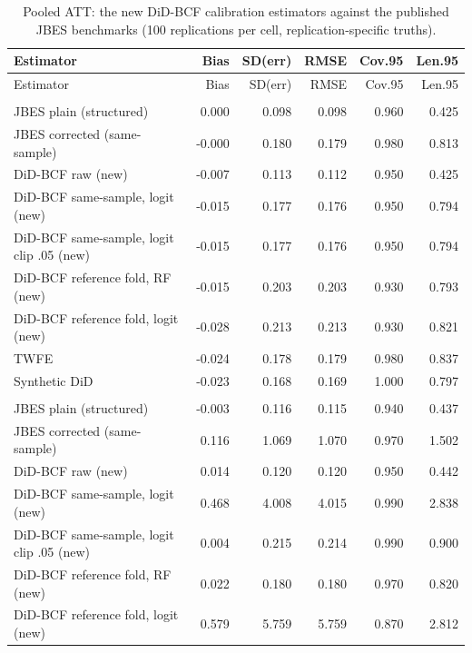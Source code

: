 {\footnotesize
\begin{longtable}{lrrrrr}
\caption{Pooled ATT: the new DiD-BCF calibration estimators against the published JBES benchmarks (100 replications per cell, replication-specific truths).}\label{tab:benchatt}\\
\toprule
Estimator & Bias & SD(err) & RMSE & Cov.95 & Len.95 \\
\midrule
\endfirsthead
\toprule
Estimator & Bias & SD(err) & RMSE & Cov.95 & Len.95 \\
\midrule
\endhead
\bottomrule
\endlastfoot
\multicolumn{6}{l}{\textit{baseline, $N=200$, degree $d=1$}} \\
\quad JBES plain (structured) & 0.000 & 0.098 & 0.098 & 0.960 & 0.425 \\
\quad JBES corrected (same-sample) & -0.000 & 0.180 & 0.179 & 0.980 & 0.813 \\
\quad DiD-BCF raw (new) & -0.007 & 0.113 & 0.112 & 0.950 & 0.425 \\
\quad DiD-BCF same-sample, logit (new) & -0.015 & 0.177 & 0.176 & 0.950 & 0.794 \\
\quad DiD-BCF same-sample, logit clip .05 (new) & -0.015 & 0.177 & 0.176 & 0.950 & 0.794 \\
\quad DiD-BCF reference fold, RF (new) & -0.015 & 0.203 & 0.203 & 0.930 & 0.793 \\
\quad DiD-BCF reference fold, logit (new) & -0.028 & 0.213 & 0.213 & 0.930 & 0.821 \\
\quad TWFE & -0.024 & 0.178 & 0.179 & 0.980 & 0.837 \\
\quad Synthetic DiD & -0.023 & 0.168 & 0.169 & 1.000 & 0.797 \\
\addlinespace
\multicolumn{6}{l}{\textit{baseline, $N=200$, degree $d=2$}} \\
\quad JBES plain (structured) & -0.003 & 0.116 & 0.115 & 0.940 & 0.437 \\
\quad JBES corrected (same-sample) & 0.116 & 1.069 & 1.070 & 0.970 & 1.502 \\
\quad DiD-BCF raw (new) & 0.014 & 0.120 & 0.120 & 0.950 & 0.442 \\
\quad DiD-BCF same-sample, logit (new) & 0.468 & 4.008 & 4.015 & 0.990 & 2.838 \\
\quad DiD-BCF same-sample, logit clip .05 (new) & 0.004 & 0.215 & 0.214 & 0.990 & 0.900 \\
\quad DiD-BCF reference fold, RF (new) & 0.022 & 0.180 & 0.180 & 0.970 & 0.820 \\
\quad DiD-BCF reference fold, logit (new) & 0.579 & 5.759 & 5.759 & 0.870 & 2.812 \\

\end{longtable}}
